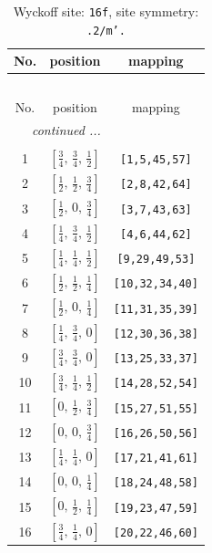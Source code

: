 \documentclass[fleqn,8pt]{jsarticle}
\begin{document}
\renewcommand{\arraystretch}{1.2}
\begin{longtable}{ccc}
\caption{Wyckoff site: {\tt 16f}, site symmetry: {\tt .2/m'.}}
 \\
 \hline \hline
No. & position & mapping \\ \hline \endfirsthead

\multicolumn{2}{l}{\tablename\ \thetable{}} \\
 \hline \hline
No. & position & mapping \\ \hline \endhead

 \hline \hline
\multicolumn{2}{r}{\footnotesize\it continued ...} \\ \endfoot

 \hline \hline
\multicolumn{2}{r}{} \\ \endlastfoot

1 & $\left[ \frac{3}{4},\, \frac{3}{4},\, \frac{1}{2} \right]$ & {\tt [1,5,45,57]} \\ \hline
2 & $\left[ \frac{1}{2},\, \frac{1}{2},\, \frac{3}{4} \right]$ & {\tt [2,8,42,64]} \\ \hline
3 & $\left[ \frac{1}{2},\, 0,\, \frac{3}{4} \right]$ & {\tt [3,7,43,63]} \\ \hline
4 & $\left[ \frac{1}{4},\, \frac{3}{4},\, \frac{1}{2} \right]$ & {\tt [4,6,44,62]} \\ \hline
5 & $\left[ \frac{1}{4},\, \frac{1}{4},\, \frac{1}{2} \right]$ & {\tt [9,29,49,53]} \\ \hline
6 & $\left[ \frac{1}{2},\, \frac{1}{2},\, \frac{1}{4} \right]$ & {\tt [10,32,34,40]} \\ \hline
7 & $\left[ \frac{1}{2},\, 0,\, \frac{1}{4} \right]$ & {\tt [11,31,35,39]} \\ \hline
8 & $\left[ \frac{1}{4},\, \frac{3}{4},\, 0 \right]$ & {\tt [12,30,36,38]} \\ \hline
9 & $\left[ \frac{3}{4},\, \frac{3}{4},\, 0 \right]$ & {\tt [13,25,33,37]} \\ \hline
10 & $\left[ \frac{3}{4},\, \frac{1}{4},\, \frac{1}{2} \right]$ & {\tt [14,28,52,54]} \\ \hline
11 & $\left[ 0,\, \frac{1}{2},\, \frac{3}{4} \right]$ & {\tt [15,27,51,55]} \\ \hline
12 & $\left[ 0,\, 0,\, \frac{3}{4} \right]$ & {\tt [16,26,50,56]} \\ \hline
13 & $\left[ \frac{1}{4},\, \frac{1}{4},\, 0 \right]$ & {\tt [17,21,41,61]} \\ \hline
14 & $\left[ 0,\, 0,\, \frac{1}{4} \right]$ & {\tt [18,24,48,58]} \\ \hline
15 & $\left[ 0,\, \frac{1}{2},\, \frac{1}{4} \right]$ & {\tt [19,23,47,59]} \\ \hline
16 & $\left[ \frac{3}{4},\, \frac{1}{4},\, 0 \right]$ & {\tt [20,22,46,60]} \\
\end{longtable}
\end{document}
